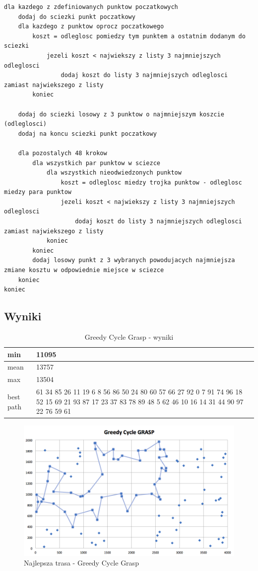 \documentclass[a4paper 10pt]{article}
\begin{document}
\begin{lstlisting}[frame=single]
dla kazdego z zdefiniowanych punktow poczatkowych
	dodaj do sciezki punkt poczatkowy
	dla kazdego z punktow oprocz poczatkowego
		koszt = odleglosc pomiedzy tym punktem a ostatnim dodanym do sciezki
			jezeli koszt < najwiekszy z listy 3 najmniejszych odleglosci
				dodaj koszt do listy 3 najmniejszych odleglosci zamiast najwiekszego z listy
		koniec
	
	dodaj do sciezki losowy z 3 punktow o najmniejszym koszcie (odleglosci)
	dodaj na koncu sciezki punkt poczatkowy
	
	dla pozostalych 48 krokow
		dla wszystkich par punktow w sciezce
			dla wszystkich nieodwiedzonych punktow
				koszt = odleglosc miedzy trojka punktow - odleglosc miedzy para punktow
				jezeli koszt < najwiekszy z listy 3 najmniejszych odleglosci
					dodaj koszt do listy 3 najmniejszych odleglosci zamiast najwiekszego z listy
			koniec
		koniec
		dodaj losowy punkt z 3 wybranych powodujacych najmniejsza zmiane kosztu w odpowiednie miejsce w sciezce
	koniec	
koniec

\end{lstlisting}
\subsection{Wyniki}

\begin{table}[H]
\center
\caption{Greedy Cycle Grasp - wyniki}
\label{Greedy Cycle Grasp- wyniki}
\begin{tabular}{|p{1cm}|p{14cm}|}
\hline
min       &  11095 \\ \hline
mean      &  13757 \\ \hline
max       &  13504 \\ \hline
best path &  61
34
85
26
11
19
6 
8 
56
86
50
24
80
60
57
66
27
92
0 
7 
91
74
96
18
52
15
69
21
93
87
17
23
37
83
78
89
48
5 
62
46
10
16
14
31
44
90
97
22
76
59
61\\ \hline
\end{tabular}
\end{table}

\begin{figure} [H]
\centering
\includegraphics[angle=0,width = 1\textwidth, height=!]{images/GCG.png}
\caption{Najlepsza trasa - Greedy Cycle Grasp}
\label{Rys. GGC}
\end{figure}
\end{document}
